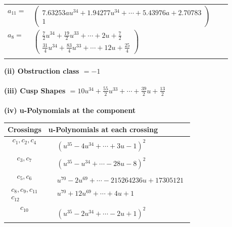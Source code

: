 \documentclass[1p]{elsarticle_modified}
\theoremstyle{definition}
\begin{document}
\begin{tabular}{m{7pt} m{180pt} m{7pt} m{180pt} }
\flushright $a_{11}=$&$\begin{pmatrix}7.63253 a u^{34}+1.94277 u^{34}+\cdots+5.43976 a+2.70783\\1\end{pmatrix}$ \\
\flushright $a_{8}=$&$\begin{pmatrix}\frac{7}{2} u^{34}+\frac{19}{2} u^{33}+\cdots+2 u+\frac{7}{2}\\\frac{31}{4} u^{34}+\frac{83}{4} u^{33}+\cdots+12 u+\frac{25}{4}\end{pmatrix}$\\&\end{tabular}
\flushleft \textbf{(ii) Obstruction class $= -1$}\\~\\
\flushleft \textbf{(iii) Cusp Shapes $= 10 u^{34}+\frac{55}{2} u^{33}+\cdots+\frac{39}{2} u+\frac{13}{2}$}\\~\\
\newpage\renewcommand{\arraystretch}{1}
\flushleft \textbf{(iv) u-Polynomials at the component}\newline \\
\begin{tabular}{m{50pt}|m{274pt}}
Crossings & \hspace{64pt}u-Polynomials at each crossing \\
\hline $$\begin{aligned}c_{1},c_{2},c_{4}\end{aligned}$$&$\begin{aligned}
&(u^{35}-4 u^{34}+\cdots+3 u-1)^{2}
\end{aligned}$\\
\hline $$\begin{aligned}c_{3},c_{7}\end{aligned}$$&$\begin{aligned}
&(u^{35}- u^{34}+\cdots-28 u-8)^{2}
\end{aligned}$\\
\hline $$\begin{aligned}c_{5},c_{6}\end{aligned}$$&$\begin{aligned}
&u^{70}-2 u^{69}+\cdots-215264236 u+17305121
\end{aligned}$\\
\hline $$\begin{aligned}c_{8},c_{9},c_{11}\\c_{12}\end{aligned}$$&$\begin{aligned}
&u^{70}+12 u^{69}+\cdots+4 u+1
\end{aligned}$\\
\hline $$\begin{aligned}c_{10}\end{aligned}$$&$\begin{aligned}
&(u^{35}-2 u^{34}+\cdots-2 u+1)^{2}
\end{aligned}$\\
\hline
\end{tabular}\\~\\
\end{document}

